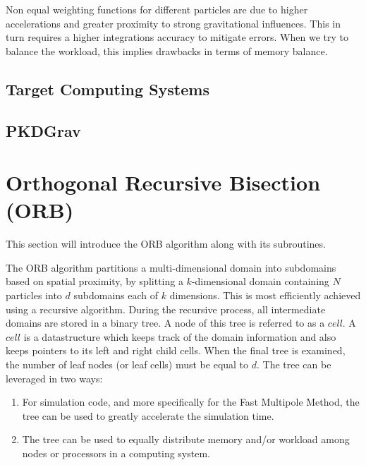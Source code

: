 \documentclass[]{article}
\begin{document}
Non equal weighting functions for different particles are due to higher accelerations and greater proximity to strong gravitational influences. This in turn requires a higher integrations accuracy to mitigate errors. When we try to balance the workload, this implies drawbacks in terms of memory balance. 



\subsection{Target Computing Systems}\label{section:target-systems}


\subsection{PKDGrav}


\newpage
\section{Orthogonal Recursive Bisection (ORB)} \label{section:orb}


This section will introduce the ORB algorithm along with its subroutines.

The ORB algorithm partitions a multi-dimensional domain into subdomains based on spatial proximity, by splitting a $k$-dimensional domain containing $N$ particles into $d$ subdomains each of $k$ dimensions. This is most efficiently achieved using a recursive algorithm. During the recursive process, all intermediate domains are stored in a binary tree. A node of this tree is referred to as a $cell$. A $cell$ is a datastructure which keeps track of the domain information and also keeps pointers to its left and right child cells. When the final tree is examined, the number of leaf nodes (or leaf cells) must be equal to $d$. The tree can be leveraged in two ways:
\begin{enumerate}
	\item For simulation code, and more specifically for the Fast Multipole Method, the tree can be used to greatly accelerate the simulation time. 
	\item The tree can be used to equally distribute memory and/or workload among nodes or processors in a computing system. 
\end{enumerate}
\end{document}
